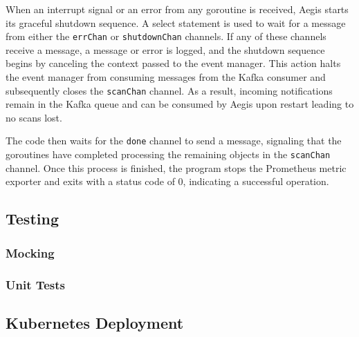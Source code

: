 \documentclass[12pt, conference, final, a4paper, onecolumn, compsoc]{IEEEtran}
\begin{document}
When an interrupt signal or an error from any goroutine is received, Aegis
starts its graceful shutdown sequence. A select statement is used to wait for a
message from either the \texttt{errChan} or \texttt{shutdownChan} channels. If
any of these channels receive a message, a message or error is logged, and the
shutdown sequence begins by canceling the context passed to the event manager.
This action halts the event manager from consuming messages from the Kafka
consumer and subsequently closes the \texttt{scanChan} channel. As a result,
incoming notifications remain in the Kafka queue and can be consumed by Aegis
upon restart leading to no scans lost.

The code then waits for the \texttt{done} channel to send a message, signaling
that the goroutines have completed processing the remaining objects in the
\texttt{scanChan} channel. Once this process is finished, the program stops the
Prometheus metric exporter and exits with a status code of 0, indicating a
successful operation.


\subsection*{Testing}

\subsubsection*{Mocking}
\paragraph{}

\subsubsection*{Unit Tests}
\paragraph{}

\subsection*{Kubernetes Deployment}
\paragraph{}
\end{document}

